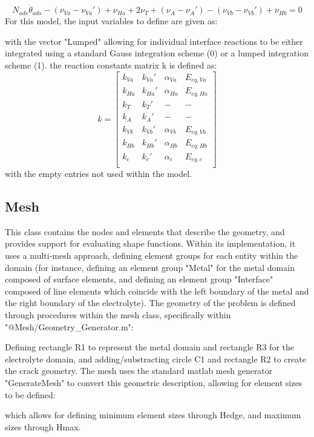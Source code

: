 \documentclass[3p]{elsarticle} %
\begin{document}
\begin{equation}
    N_{ads} \dot{\theta}_{ads} - (\nu_{Va}-\nu_{Va}') + \nu_{Ha} + 2 \nu_T + (\nu_A-\nu_A') - (\nu_{Vb}-\nu_{Vb}') + \nu_{Hb} = 0
\end{equation}
For this model, the input variables to define are given as:

with the vector "Lumped" allowing for individual interface reactions to be either integrated using a standard Gauss integration scheme (0) or a lumped integration scheme (1). the reaction constants matrix k is defined as:
\begin{equation}
	k = \begin{bmatrix} 
	k_{Va} & k_{Va}' & \alpha_{Va} & E_{eq,Va} \\ 
	k_{Ha} & k_{Ha}' & \alpha_{Ha} & E_{eq,Ha} \\ 
	k_{T} & k_{T}' & - & - \\ 
	k_{A} & k_{A}' & - & - \\ 
	k_{Vb} & k_{Vb}' & \alpha_{Vb} & E_{eq,Vb} \\ 
	k_{Hb} & k_{Hb}' & \alpha_{Hb} & E_{eq,Hb} \\ 
	k_{c} & k_{c}' & \alpha_{c} & E_{eq,c} \\ 
	\end{bmatrix}
\end{equation}
with the empty entries not used within the model.


\subsection{Mesh}
This class contains the nodes and elements that describe the geometry, and provides support for evaluating shape functions. Within its implementation, it uses a multi-mesh approach, defining element groups for each entity within the domain (for instance, defining an element group "Metal" for the metal domain composed of surface elements, and defining an element group "Interface" composed of line elements which coincide with the left boundary of the metal and the right boundary of the electrolyte). The geometry of the problem is defined through procedures within the mesh class, specifically within "@Mesh/Geometry{\_}Generator.m":

Defining rectangle R1 to represent the metal domain and rectangle R3 for the electrolyte domain, and adding/substracting circle C1 and rectangle R2 to create the crack geometry. The mesh uses the standard matlab mesh generator "GenerateMesh" to convert this geometric description, allowing for element sizes to be defined:

which allows for defining minimum element sizes through Hedge, and maximum sizes through Hmax. 
\end{document}
